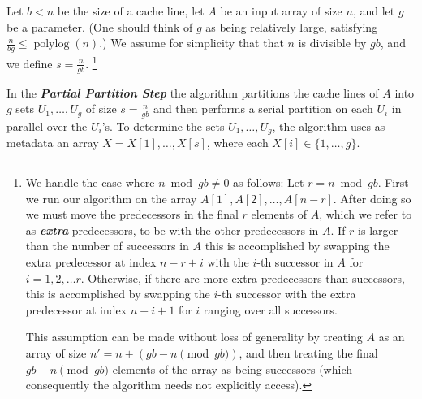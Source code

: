 \documentclass[sigplan, 10pt, nonacm]{acmart}
\newcommand{\defn}[1]{{\textit{\textbf{\boldmath #1}}}}
\renewcommand{\paragraph}[1]{\vspace{0.09in}\noindent{\bf \boldmath #1.}}
\theoremstyle{remark}
\theoremstyle{remark}
\begin{document}
\paragraph{Formal Algorithm Description} Let $b < n$ be the size of a cache line, let $A$ be an input array of size
$n$, and let $g$ be a parameter. (One should think of $g$ as being
relatively large, satisfying $\frac{n}{bg} \le
\operatorname{polylog}(n)$.)  We assume for simplicity that that $n$
is divisible by $gb$, and we define $s = \frac{n}{gb}$.
\footnote{ %
{\color{red} We handle the case where $n\bmod gb \neq 0$ as follows: Let $r = n
  \bmod gb$. First we run our algorithm on the array $A[1], A[2], \ldots,
  A[n-r]$. After doing so we must move the predecessors in the final $r$
  elements of $A$, which we refer to as \defn{extra} predecessors, to be with
  the other predecessors in $A$. If $r$ is larger than the number of successors
in $A$ this is accomplished by swapping the extra predecessor at index $n-r+i$
with the $i$-th successor in $A$ for $i = 1,2,\ldots r$. Otherwise, if there are more extra
predecessors than successors, this is accomplished by swapping the $i$-th
successor with the extra predecessor at index $n-i+1$ for $i$ ranging over all successors. }

{\color{blue} This assumption can be made without loss of generality by treating $A$ as
an array of size $n' = n + {(gb - n \pmod {gb})}$, and then treating
the final $gb - n \pmod {gb}$ elements of the array as being
successors (which consequently the algorithm needs not explicitly
access).}
}

In the \defn{Partial Partition Step} the algorithm partitions the
cache lines of $A$ into $g$ sets $U_1, \ldots, U_{g}$ of size $s =
\frac{n}{gb}$ and then performs a serial partition on each 
$U_i$ in parallel over the $U_i$'s. To determine the sets $U_1, \ldots, U_{g}$, the
algorithm uses as metadata an array $X = X[1], \ldots, X[s]$,
where each $X[i] \in \{1, \ldots, g\}$.
\end{document}
